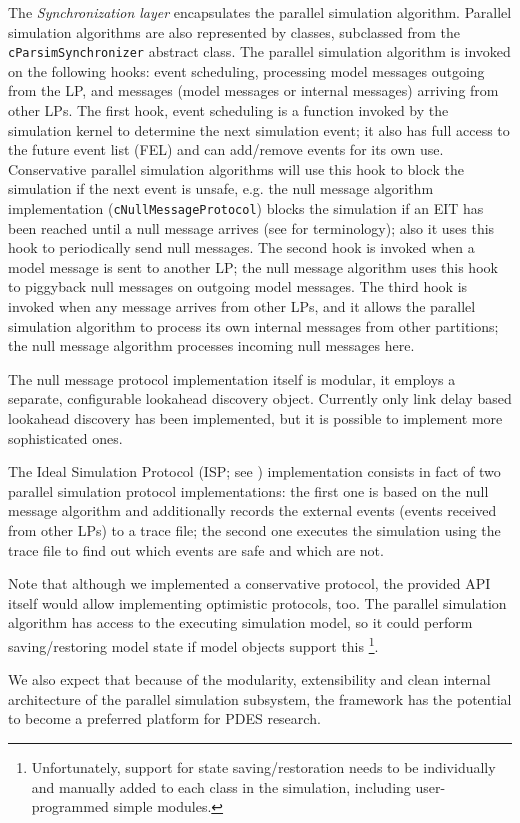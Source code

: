The \textit{Synchronization layer} encapsulates the parallel
simulation algorithm. Parallel simulation algorithms are also represented
by classes, subclassed from the \texttt{cParsimSynchronizer} abstract class.
The parallel simulation algorithm is invoked on the following hooks:
event scheduling, processing model messages outgoing from the LP,
and messages (model messages or internal messages) arriving
from other LPs. The first hook, event scheduling is a function
invoked by the simulation kernel to determine the next simulation
event; it also has full access to the future event list (FEL) and
can add/remove events for its own use.
Conservative parallel simulation algorithms will use this hook
to block the simulation if the next event is unsafe, e.g. the
null message algorithm implementation (\texttt{cNullMessageProtocol})
blocks the simulation if an EIT has been reached until a null message
arrives (see \cite{bagrodia00} for terminology); also it uses
this hook to periodically send null messages. The second hook
is invoked when a model message is sent to another LP;
the null message algorithm uses this hook to piggyback null
messages on outgoing model messages. The third hook is invoked
when any message arrives from other LPs, and it allows the
parallel simulation algorithm to process its own internal messages
from other partitions; the null message algorithm processes
incoming null messages here.

The null message protocol implementation itself is modular,
it employs a separate, configurable lookahead discovery object.
Currently only link delay based lookahead discovery has been
implemented, but it is possible to implement more sophisticated
ones.

The Ideal Simulation Protocol (ISP; see \cite{bagrodia00})
implementation consists in fact of two parallel simulation
protocol implementations:
the first one is based on the null message algorithm and
additionally records the external events (events received
from other LPs) to a trace file; the second one executes
the simulation using the trace file to find out which
events are safe and which are not.

Note that although we implemented a conservative protocol,
the provided API itself would allow implementing optimistic
protocols, too. The parallel simulation algorithm has
access to the executing simulation model, so it could perform
saving/restoring model state if model objects support this
  \footnote{Unfortunately, support for state saving/restoration
  needs to be individually and manually added to each class
  in the simulation, including user-programmed simple modules.}.

We also expect that because of the modularity, extensibility and
clean internal architecture of the parallel simulation subsystem,
the {\opp} framework has the potential to become a preferred platform
for PDES research.


